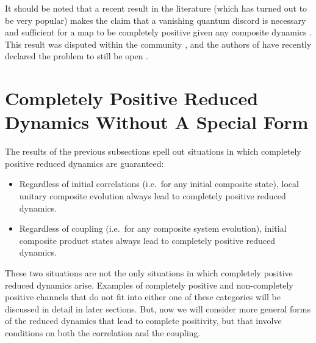 It should be noted that a recent result in the literature (which has turned out to be very popular) makes the claim that a vanishing quantum discord is necessary and sufficient for a map to be completely positive given any composite dynamics \cite{Lidar2009a}.  This result was disputed within the community \cite{Cesar2013,Simon2013}, and the authors of \cite{Lidar2009a} have recently declared the problem to still be open \cite{Dominy2013}. 

\section{Completely Positive Reduced Dynamics Without A Special Form}
The results of the previous subsections spell out situations in which completely positive reduced dynamics are guaranteed:
\begin{itemize}
\item Regardless of initial correlations (i.e.\ for any initial composite state), local unitary composite evolution always lead to completely positive reduced dynamics.
\item Regardless of coupling (i.e.\ for any composite system evolution), initial composite product states always lead to completely positive reduced dynamics.
\end{itemize}
These two situations are not the only situations in which completely positive reduced dynamics arise.  Examples of completely positive and non-completely positive channels that do not fit into either one of these categories will be discussed in detail in later sections.  But, now we will consider more general forms of the reduced dynamics that lead to complete positivity, but that involve conditions on both the correlation and the coupling.

